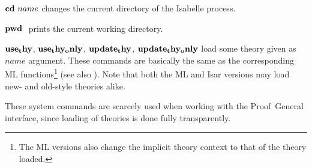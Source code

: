 \begin{descr}
\item [${\mathord{\mathbf{cd}}}~name$] changes the current directory of the Isabelle
  process.
\item [${\mathord{\mathbf{pwd}}}~$] prints the current working directory.
\item [${\mathord{\mathbf{use_thy}}}$, ${\mathord{\mathbf{use_thy_only}}}$,
  ${\mathord{\mathbf{update_thy}}}$, ${\mathord{\mathbf{update_thy_only}}}$] load some
  theory given as $name$ argument.  These commands are basically the same as
  the corresponding ML functions\footnote{The ML versions also change the
    implicit theory context to that of the theory loaded.}  (see also
  \cite[\S1,\S6]{isabelle-ref}).  Note that both the ML and Isar versions may
  load new- and old-style theories alike.
\end{descr}

These system commands are scarcely used when working with the Proof~General
interface, since loading of theories is done fully transparently.


